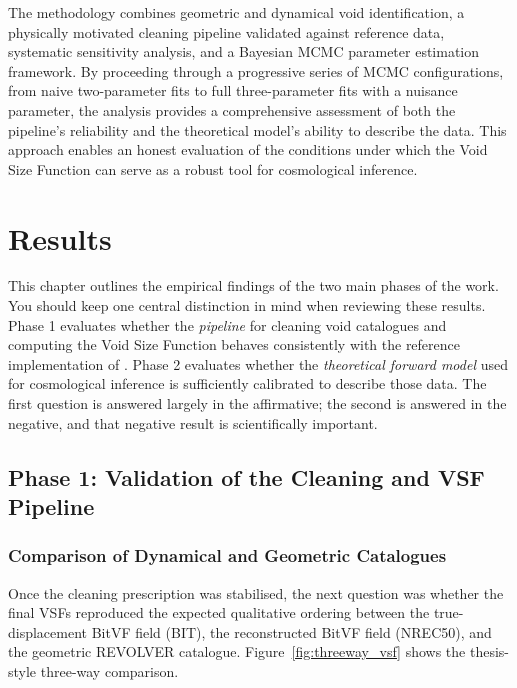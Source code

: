 \documentclass[12pt]{report}
\begin{document}
The methodology combines geometric and dynamical void identification, a physically motivated cleaning pipeline validated against reference data, systematic sensitivity analysis, and a Bayesian MCMC parameter estimation framework. By proceeding through a progressive series of MCMC configurations, from naive two-parameter fits to full three-parameter fits with a nuisance parameter, the analysis provides a comprehensive assessment of both the pipeline's reliability and the theoretical model's ability to describe the data. This approach enables an honest evaluation of the conditions under which the Void Size Function can serve as a robust tool for cosmological inference.



\chapter{Results}
\label{chap:results}

This chapter outlines the empirical findings of the two main phases of the work. You should keep one central distinction in mind when reviewing these results. Phase 1 evaluates whether the \emph{pipeline} for cleaning void catalogues and computing the Void Size Function behaves consistently with the reference implementation of \citet{Sartori2025}. Phase 2 evaluates whether the \emph{theoretical forward model} used for cosmological inference is sufficiently calibrated to describe those data. The first question is answered largely in the affirmative; the second is answered in the negative, and that negative result is scientifically important.

\section{Phase 1: Validation of the Cleaning and VSF Pipeline}
\label{sec:results_phase1}

\subsection{Comparison of Dynamical and Geometric Catalogues}

Once the cleaning prescription was stabilised, the next question was whether the final VSFs reproduced the expected qualitative ordering between the true-displacement BitVF field (BIT), the reconstructed BitVF field (NREC50), and the geometric REVOLVER catalogue. Figure~\ref{fig:threeway_vsf} shows the thesis-style three-way comparison.
\end{document}
